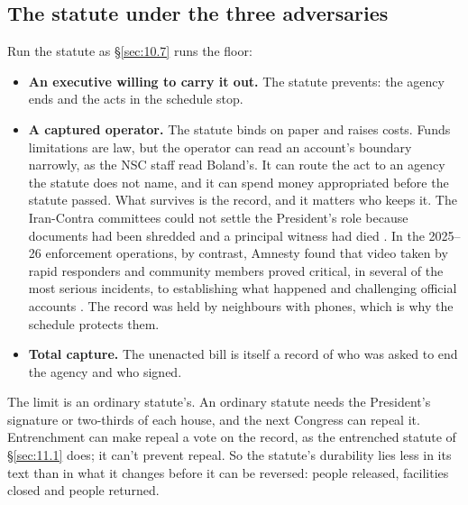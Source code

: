 \subsection{The statute under the three adversaries}
\label{sec:10.4.4}
Run the statute as \S\ref{sec:10.7} runs the floor:

\begin{itemize}
\item \textbf{An executive willing to carry it out.} The statute prevents: the agency ends and the acts in the schedule stop.
\item \textbf{A captured operator.} The statute binds on paper and raises costs. Funds limitations are law, but the operator can read an account's boundary narrowly, as the NSC staff read Boland's. It can route the act to an agency the statute does not name, and it can spend money appropriated before the statute passed. What survives is the record, and it matters who keeps it. The Iran-Contra committees could not settle the President's role because documents had been shredded and a principal witness had died \autocite{irancontra1987}. In the 2025–26 enforcement operations, by contrast, Amnesty found that video taken by rapid responders and community members proved critical, in several of the most serious incidents, to establishing what happened and challenging official accounts \autocite{Amnesty2026Whistles}. The record was held by neighbours with phones, which is why the schedule protects them.
\item \textbf{Total capture.} The unenacted bill is itself a record of who was asked to end the agency and who signed.
\end{itemize}

The limit is an ordinary statute's. An ordinary statute needs the President's signature or two-thirds of each house, and the next Congress can repeal it. Entrenchment can make repeal a vote on the record, as the entrenched statute of \S\ref{sec:11.1} does; it can't prevent repeal. So the statute's durability lies less in its text than in what it changes before it can be reversed: people released, facilities closed and people returned.
